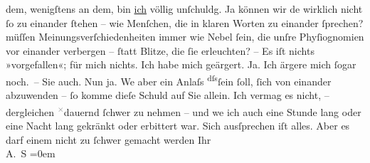 \begin{ledgroupsized}[t]{13cm}
               dem, wenigſtens an dem, bin \uline{ich} völlig unſchuldg. Ja
               können wir de{\geminationn} wirklich nicht ſo zu einander ſtehen –
               wie Menſchen, die in klaren Worten zu einander ſprechen? {\pb}müſſen Meinungsverſchiedenheiten immer wie
               Nebel ſein, die unſre Phyſiognomien vor einander verbergen – ſtatt Blitze, die ſie
               erleuchten?\pend
           \pstart
           – Es iſt nichts »vorgefallen«; für mich nichts. Ich habe mich geärgert.
               Ja. Ich ärgere mich ſogar noch. – Sie auch. Nun ja. We{\geminationn}
               aber ein Anlaſs \substVorne{}\textsuperscript{dſs}\substDazwischen{}ſein ſoll\substHinten{}, ſich von einander abzu{\pb}wenden – ſo
               komme dieſe Schuld auf Sie allein. Ich vermag es nicht, – dergleichen \substVorne{}\textsuperscript{\textcolor{gray}{×}}\substDazwischen{}dauernd\substHinten{} ſchwer zu nehmen – und we{\geminationn} ich auch \strikeout{\textcolor{gray}{×}\-\textcolor{gray}{×}\-\textcolor{gray}{×}\-\textcolor{gray}{×}\-\textcolor{gray}{×}\-\textcolor{gray}{×}\-\textcolor{gray}{×}\-\textcolor{gray}{×}\-\textcolor{gray}{×}}{ }\strikeout{\textcolor{gray}{und}} eine Stunde lang oder eine Nacht lang gekränkt oder erbittert war. Sich
               ausſprechen iſt alles. Aber es darf einem nicht {\pb}zu ſchwer gemacht werden\pend
           \pstart
           Ihr {\\[\baselineskip]}\spacefill\mbox{A. S}\pend
           \leftskip=0em{}
         
         \endnumbering{}\end{ledgroupsized}  \newcommand{\dateiname}{L02989}\newcommand{\titel}{Arthur Schnitzler an Felix Salten, 10. 11. 1903}\newcommand{\editorInnen}{Martin Anton Müller und Laura Untner}
      